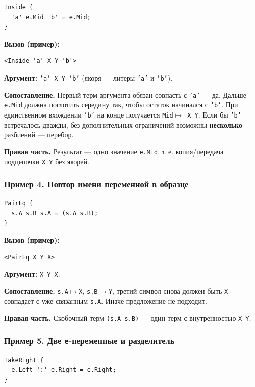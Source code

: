 \documentclass[12pt,a4paper]{article}
\begin{document}
\begin{lstlisting}
Inside {
  'a' e.Mid 'b' = e.Mid;
}
\end{lstlisting}

\noindent\textbf{Вызов (пример):}
\begin{lstlisting}
<Inside 'a' X Y 'b'>
\end{lstlisting}
\textbf{Аргумент:} \texttt{'a' X Y 'b'} (якоря --- литеры \texttt{'a'} и \texttt{'b'}).

\textbf{Сопоставление.} Первый терм аргумента обязан совпасть с \texttt{'a'} --- да. Дальше \texttt{e.Mid} должна поглотить середину так, чтобы остаток начинался с \texttt{'b'}. При единственном вхождении \texttt{'b'} на конце получается \texttt{Mid$\mapsto$ X Y}. Если бы \texttt{'b'} встречалось дважды, без дополнительных ограничений возможны \textbf{несколько} разбиений --- перебор.

\textbf{Правая часть.} Результат --- одно значение \texttt{e.Mid}, т.\,е. копия/передача подцепочки \texttt{X Y} без якорей.

\subsubsection*{Пример 4. Повтор имени переменной в образце}

\begin{lstlisting}
PairEq {
  s.A s.B s.A = (s.A s.B);
}
\end{lstlisting}

\noindent\textbf{Вызов (пример):}
\begin{lstlisting}
<PairEq X Y X>
\end{lstlisting}
\textbf{Аргумент:} \texttt{X Y X}.

\textbf{Сопоставление.} \texttt{s.A$\mapsto$X}, \texttt{s.B$\mapsto$Y}, третий символ снова должен быть \texttt{X} --- совпадает с уже связанным \texttt{s.A}. Иначе предложение не подходит.

\textbf{Правая часть.} Скобочный терм \texttt{(s.A s.B)} --- один терм с внутренностью \texttt{X Y}.

\subsubsection*{Пример 5. Две \texttt{e}-переменные и разделитель}

\begin{lstlisting}
TakeRight {
  e.Left ':' e.Right = e.Right;
}
\end{lstlisting}
\end{document}

